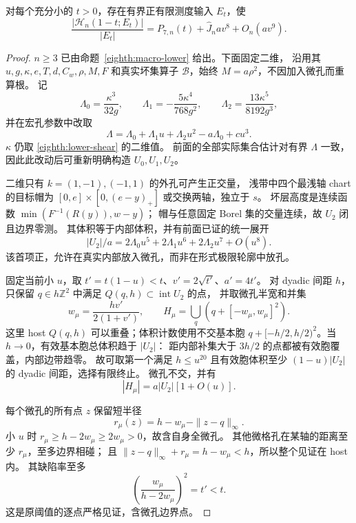 \begin{proposition}[精确八阶的有限下界]\label{eighth:lower}
对每个充分小的 \(t>0\)，存在有界正有限测度输入 \(E_t\)，使
\[
 \frac{|\mathcal H_n(1-t;E_t)|}{|E_t|}
       =P_{7,n}(t)+\widehat J_nav^8+O_n(av^9).
\]
\end{proposition}
\begin{proof}
\(n\ge3\) 已由命题~\ref{eighth:macro-lower} 给出。下面固定二维，
沿用其 \(u,g,\kappa,e,T,d,C_w,\rho,M,F\) 和真实坏集算子
\(\mathcal B\)，始终 \(M=a\rho^2\)，不因加入微孔而重算根。
记
\[
 \Lambda_0=\frac{\kappa^3}{32g},\qquad
 \Lambda_1=-\frac{5\kappa^4}{768g^2},\qquad
 \Lambda_2=\frac{13\kappa^5}{8192g^3},
\]
并在宏孔参数中改取
\begin{equation}\label{eighth:exact-micro-budget}
 \Lambda=\Lambda_0+\Lambda_1u+\Lambda_2u^2-a\Lambda_0+cu^3.
\end{equation}
\(\kappa\) 仍取 \eqref{eighth:lower-shear} 的二维值。
前面的全部实际集合估计对有界 \(\Lambda\) 一致，
因此此改动后可重新明确构造 \(U_0,U_1,U_2\)。

二维只有 \(k=(1,-1),(-1,1)\) 的外孔可产生正交量，
浅带中四个最浅轴 chart 的目标帽为
\([0,e]\times[0,(e-y)_+]\) 或交换两轴，独立于 \(s\)。
坏层高度是连续函数
\(\min(F^{-1}(R(y)),w-y)\)；
帽与任意固定 Borel 集的交量连续，故 \(U_2\) 闭且边界零测。
其体积等于内部体积，并有前面已证的统一展开
\[
 |U_2|/a=2\Lambda_0u^5+2\Lambda_1u^6+2\Lambda_2u^7+O(u^8).
\]
该首项正，允许在真实内部放入微孔，而非在形式极限轮廓中放孔。

固定当前小 \(u\)，取 \(t'=t(1-u)<t\)、\(v'=2\sqrt{t'}\)、\(a'=4t'\)。
对 dyadic 间距 \(h\)，只保留
\(q\in h\mathbb Z^2\) 中满足 \(Q(q,h)\subset\operatorname{int}U_2\) 的点，
并取微孔半宽和并集
\[
 w_\mu=\frac{hv'}{2(1+v')},\qquad
 H_\mu=\bigcup_q(q+[-w_\mu,w_\mu]^2).
\]
这里 host \(Q(q,h)\) 可以重叠；体积计数使用不交基本胞
\(q+[-h/2,h/2)^2\)。当 \(h\to0\)，有效基本胞总体积趋于 \(|U_2|\)：
距内部补集大于 \(3h/2\) 的点都被有效胞覆盖，内部边带趋零。
故可取第一个满足 \(h\le u^{20}\) 且有效胞体积至少
\((1-u)|U_2|\) 的 dyadic 间距，选择有限终止。
微孔不交，并有
\begin{equation}\label{eighth:exact-micro-mass}
 |H_\mu|=a|U_2|[1+O(u)].
\end{equation}

每个微孔的所有点 \(z\) 保留短半径
\[
 r_\mu(z)=h-w_\mu-\|z-q\|_\infty.
\]
小 \(u\) 时 \(r_\mu\ge h-2w_\mu\ge2w_\mu>0\)，故含自身全微孔。
其他微格孔在某轴的距离至少 \(r_\mu\)，至多边界相碰；
且 \(\|z-q\|_\infty+r_\mu=h-w_\mu<h\)，所以整个见证在 host 内。
其缺陷率至多
\[
 \left(\frac{w_\mu}{h-2w_\mu}\right)^2=t'<t.
\]
这是原阈值的逐点严格见证，含微孔边界点。


\end{proof}
